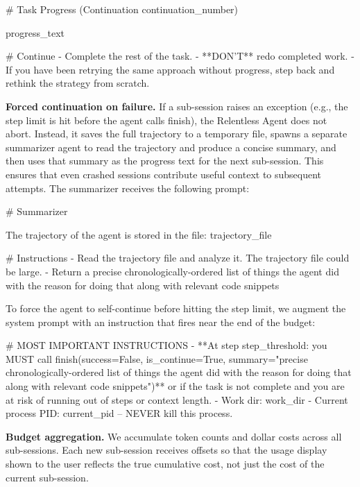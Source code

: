 \documentclass{article}
\begin{document}
\begin{prompt}
# Task Progress (Continuation {continuation_number})

{progress_text}

# Continue
- Complete the rest of the task.
- **DON'T** redo completed work.
- If you have been retrying the same approach without progress,
  step back and rethink the strategy from scratch.
\end{prompt}

\textbf{Forced continuation on failure.}  If a sub-session raises an
exception (e.g., the step limit is hit before the agent calls finish),
the Relentless Agent does not abort.  Instead, it saves the full
trajectory to a temporary file, spawns a separate summarizer agent to
read the trajectory and produce a concise summary, and then uses that
summary as the progress text for the next sub-session.  This ensures
that even crashed sessions contribute useful context to subsequent
attempts.  The summarizer receives the following prompt:

\begin{prompt}
# Summarizer

The trajectory of the agent is stored in the file: {trajectory_file}

# Instructions
- Read the trajectory file and analyze it.  The trajectory file
  could be large.
- Return a precise chronologically-ordered list of things the
  agent did with the reason for doing that along with relevant
  code snippets
\end{prompt}

\noindent To force the agent to self-continue before hitting the step limit,
we augment the system prompt with an instruction that fires near the
end of the budget:

\begin{prompt}
# MOST IMPORTANT INSTRUCTIONS
- **At step {step_threshold}: you MUST call
  finish(success=False, is_continue=True,
  summary="precise chronologically-ordered list of things
  the agent did with the reason for doing that along with
  relevant code snippets")** or if the task is not complete
  and you are at risk of running out of steps or context
  length.
- Work dir: {work_dir}
- Current process PID: {current_pid} -- NEVER kill this
  process.
\end{prompt}

\textbf{Budget aggregation.}  We accumulate token counts and dollar
costs across all sub-sessions.  Each new sub-session receives
offsets so that the usage display shown to the user reflects the true
cumulative cost, not just the cost of the current sub-session.
\end{document}

